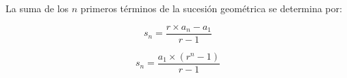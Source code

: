 La suma de los $n$ primeros términos de la sucesión geométrica se determina por:

$$ s_n = \frac{r \times a_n - a_1}{r-1} $$

$$ s_n = \frac{a_1 \times (r^n -1)}{r-1} $$